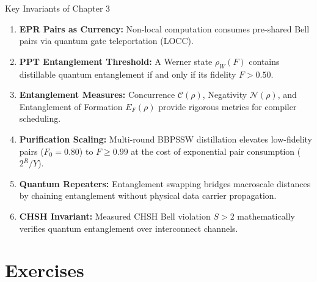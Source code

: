 \begin{summarybox}{Key Invariants of Chapter 3}
\begin{enumerate}
    \item \textbf{EPR Pairs as Currency:} Non-local computation consumes pre-shared Bell pairs via quantum gate teleportation (LOCC).
    \item \textbf{PPT Entanglement Threshold:} A Werner state $\rho_W(F)$ contains distillable quantum entanglement if and only if its fidelity $F > 0.50$.
    \item \textbf{Entanglement Measures:} Concurrence $\mathcal{C}(\rho)$, Negativity $\mathcal{N}(\rho)$, and Entanglement of Formation $E_F(\rho)$ provide rigorous metrics for compiler scheduling.
    \item \textbf{Purification Scaling:} Multi-round BBPSSW distillation elevates low-fidelity pairs ($F_0 = 0.80$) to $F \ge 0.99$ at the cost of exponential pair consumption ($2^R / Y$).
    \item \textbf{Quantum Repeaters:} Entanglement swapping bridges macroscale distances by chaining entanglement without physical data carrier propagation.
    \item \textbf{CHSH Invariant:} Measured CHSH Bell violation $S > 2$ mathematically verifies quantum entanglement over interconnect channels.
\end{enumerate}
\end{summarybox}


\section*{Exercises}

